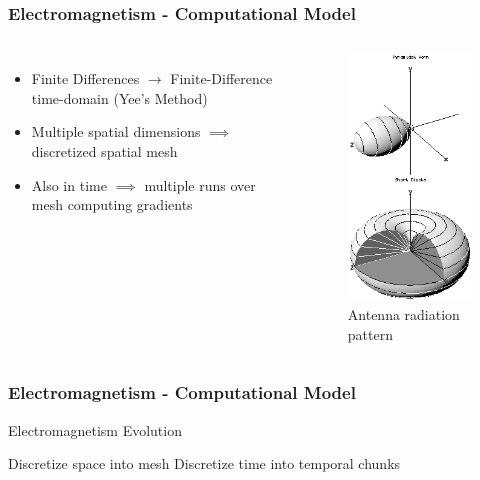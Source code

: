 \documentclass{beamer}
\begin{document}
\begin{frame}
    \frametitle{Electromagnetism - Computational Model}
    \begin{columns}
        \begin{itemize}
            \item Finite Differences $\to$ Finite-Difference time-domain (Yee's Method)
            \item Multiple spatial dimensions $\implies$ discretized spatial mesh
            \item Also in time $\implies$ multiple runs over mesh computing gradients 
        \end{itemize}
        \begin{figure}[H]
            \includegraphics[height=0.7\textheight]{images/Radiation-patterns-v.png}
            \caption{Antenna radiation pattern}
        \end{figure}
    \end{columns}
\end{frame}

\begin{frame}
    \frametitle{Electromagnetism - Computational Model}

    \small \begin{algorithm}[H] \DontPrintSemicolon
        \caption{Electromagnetism Evolution}
        Discretize space into mesh\;
        Discretize time into temporal chunks\;
    \end{algorithm}

\end{frame}
\end{document}
